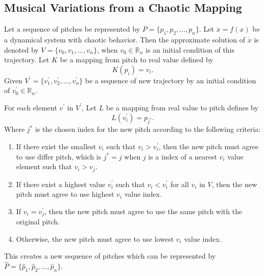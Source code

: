 \documentclass[11pt]{article}
\begin{document}
\subsection{Musical Variations from a Chaotic Mapping}

Let a sequence of pitches be represented by $P = \{p_1, p_2, \dots, p_n\}$. Let $\dot{x} = f(x)$ be a dynamical system with chaotic behavior. Then the approximate solution of $\dot{x}$ is denoted by $V = \{v_0, v_1, \dots, v_n\}$, when $v_0 \in \mathbb{R}_n$ is an initial condition of this trajectory. Let $K$ be a mapping from pitch to real value defined by 
$$K(p_i) = v_i.$$ 
Given $V^\prime = \{ v^\prime_1, v^\prime_2, \dots, v^\prime_n \}$ be a sequence of new trajectory by an initial condition of $v^\prime_0 \in \mathbb{R}_n$.

For each element $v^\prime$ in $V^\prime$, Let $L$ be a mapping from real value to pitch defines by 
$$L(v^\prime_i) = p_{j^*}.$$ 
Where $j^*$ is the chosen index for the new pitch according to the following criteria:
\begin{enumerate}
	\item If there exist the smallest $v_i$ such that $v_i > v^\prime_i$, then the new pitch must agree to use differ pitch, which is $j^* = j$ when $j$ is a index of a nearest $v_i$ value element such that $v_i > v_j$.
	\item If there exist a highest value $v^\prime_i$ such that $v_i < v^\prime_i$ for all $v_i$ in $V$, then the new pitch must agree to use highest $v_i$ value index. 
	\item If $v_i = v^\prime_j$, then the new pitch must agree to use the same pitch with the original pitch. 
	\item Otherwise, the new pitch must agree to use lowest $v_i$ value index.
\end{enumerate}
This creates a new sequence of pitches which can be represented by $\hat{P} =\{ \hat{p}_1, \hat{p}_2, \dots, \hat{p}_n \}$.
\end{document}

